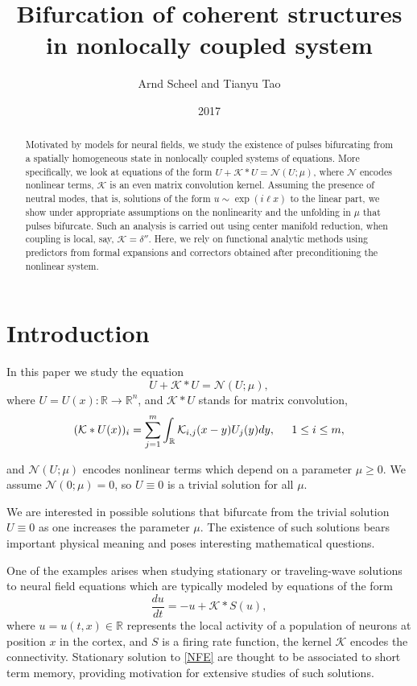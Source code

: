 \documentclass[letterpaper,11pt]{article}
\title{Bifurcation of coherent structures in nonlocally coupled system}
\author{Arnd Scheel and Tianyu Tao}
\date{2017}
\newcommand{\R}{\mathbb{R}}
\newcommand{\Nl}{\mathcal{N}}
\newcommand{\K}{\mathcal{K}}
\numberwithin{equation}{section}
\theoremstyle{plain}
\theoremstyle{remark}
\begin{document}
\maketitle
\begin{abstract}

Motivated by models for neural fields, we study the existence of pulses  bifurcating from a spatially homogeneous state in nonlocally coupled systems of equations. More specifically, we look at equations of the form $U + \K\ast U = \Nl(U;\mu)$, where $\Nl$ encodes nonlinear terms, $\K$ is an even matrix convolution kernel. Assuming the presence of neutral modes, that is, solutions of the form $u\sim \exp(i \ell x)$ to the linear part, we show under appropriate assumptions on the nonlinearity and the unfolding in $\mu$ that pulses bifurcate. Such an analysis is carried out using center manifold reduction, when coupling is local, say, $\K=\delta''$. Here, we rely on functional analytic methods using predictors from formal expansions and correctors obtained after preconditioning the nonlinear system.
\end{abstract}

\section{Introduction}
In this paper we study the equation
\begin{equation} \label{system}
U+\K\ast U = \Nl(U;\mu) ,
\end{equation}
where $U=U(x):\R \to \R^n$, and $\K\ast U$ stands for matrix convolution,
\[
(\K\ast U(x))_i = \sum_{j=1}^m \int_\R \K_{i,j}(x-y)U_j(y)dy, \hspace{0.2in} 1\le i\le m,
\]

and $\Nl(U;\mu)$ encodes nonlinear terms which depend on a parameter $\mu\ge 0$. We assume $\Nl(0;\mu) =0$, so $U\equiv 0$ is a trivial solution for all $\mu$.

We are interested in possible solutions that bifurcate from the trivial solution $U\equiv 0$ as one increases the parameter $\mu$. The existence of such solutions bears important physical meaning and poses interesting mathematical questions.

One of the examples arises when studying stationary or traveling-wave solutions to neural field equations which are typically modeled by equations of the form
\begin{equation}\label{NFE}
\frac{du}{dt} =- u+\K\ast S(u),
\end{equation}
where $u=u(t,x) \in \R$ represents the local activity of a population of neurons at position $x$ in the cortex, and $S$ is a firing rate function, the kernel $\K$ encodes the connectivity. Stationary solution to \eqref{NFE} are thought to be associated to short term memory, providing motivation for extensive studies of such solutions.
\end{document}
